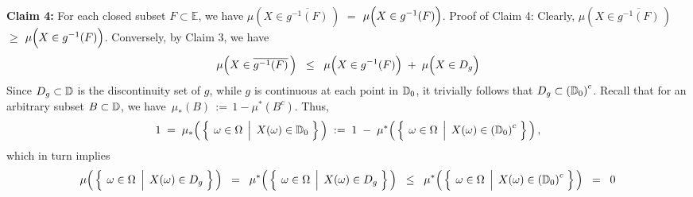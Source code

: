 \vskip 0.5cm
\noindent
\textbf{Claim 4:}\;\;
For each closed subset $F \subset \mathbb{E}$, we have\;
$\mu\!\left(X\in\overline{g^{-1}(F)}\,\right)$ \;$=$\;
$\mu\!\left(X\overset{{\color{white}.}}{\in} g^{-1}(F)\right)$.
\vskip 0.1cm
\noindent
Proof of Claim 4:\quad
Clearly, 
$\mu\!\left(X\in\overline{g^{-1}(F)}\,\right)$ \;$\geq$\;
$\mu\!\left(X\overset{{\color{white}.}}{\in} g^{-1}(F)\right)$.
Conversely, by Claim 3, we have
\begin{equation*}
\mu\!\left(X\in\overline{g^{-1}(F)}\,\right)
\;\;\leq\;\;
	\mu\!\left(X\overset{{\color{white}.}}{\in} g^{-1}(F)\right)
	\; + \;
	\mu\!\left(X\overset{{\color{white}.}}{\in} D_{g}\right)
\end{equation*}
Since $D_{g} \subset \mathbb{D}$ is the discontinuity set of $g$, while $g$ is continuous at each point in $\mathbb{D}_{0}$,
it trivially follows that $D_{g} \subset \left(\mathbb{D}_{0}\right)^{c}$.
Recall that for an arbitrary subset $B \subset \mathbb{D}$, we have \,$\mu_{*}(B) \,:=\, 1 - \mu^{*}(B^{c})$.
Thus,
\begin{equation*}
1
\;=\;
	\mu_{*}\!\left(\,\left\{\;\left.\omega\overset{{\color{white}.}}{\in}\Omega\;\,\right\vert\;X(\omega)\in\D_{0}\;\right\}\,\right)
\;:=\;
	1 \; - \; \mu^{*}\!\left(\,\left\{\;\left.\omega\overset{{\color{white}.}}{\in}\Omega\;\,\right\vert\;X(\omega)\in\left(\D_{0}\right)^{c}\;\right\}\,\right),
\end{equation*}
which in turn implies
\begin{equation*}
\mu\!\left(\,\left\{\;\left.\omega\overset{{\color{white}.}}{\in}\Omega\;\,\right\vert\;X(\omega)\in D_{g}\;\right\}\,\right)
\;\;=\;\; \mu^{*}\!\left(\,\left\{\;\left.\omega\overset{{\color{white}.}}{\in}\Omega\;\,\right\vert\;X(\omega)\in D_{g}\;\right\}\,\right)
\;\;\leq\;\; \mu^{*}\!\left(\,\left\{\;\left.\omega\overset{{\color{white}.}}{\in}\Omega\;\,\right\vert\;X(\omega)\in\left(\D_{0}\right)^{c}\;\right\}\,\right)
\;\;=\;\; 0
\end{equation*}


